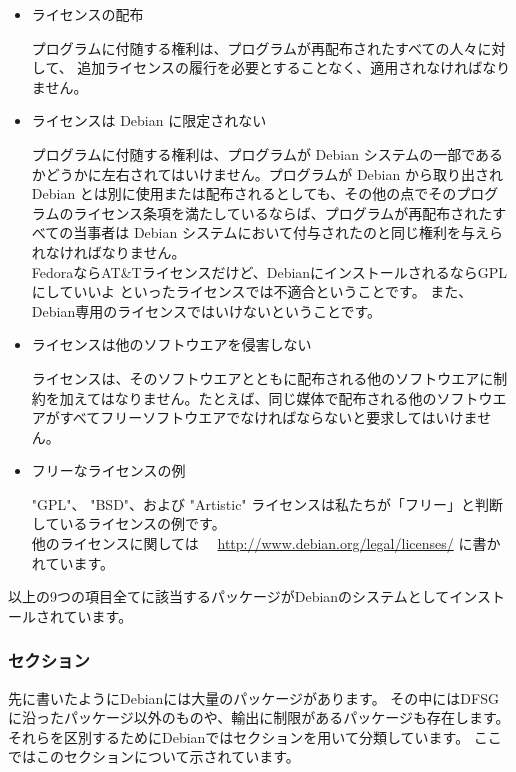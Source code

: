 \documentclass[mingoth,a4paper]{jsarticle}
\begin{document}
\begin{itemize}
 \item ライセンスの配布

プログラムに付随する権利は、プログラムが再配布されたすべての人々に対して、
追加ライセンスの履行を必要とすることなく、適用されなければなりません。


 \item ライセンスは Debian に限定されない

プログラムに付随する権利は、プログラムが Debian システムの一部であるかどうかに左右されてはいけません。プログラムが Debian から取り出され Debian とは別に使用または配布されるとしても、その他の点でそのプログラムのライセンス条項を満たしているならば、プログラムが再配布されたすべての当事者は Debian システムにおいて付与されたのと同じ権利を与えられなければなりません。
\\

FedoraならAT\&Tライセンスだけど、DebianにインストールされるならGPLにしていいよ  といったライセンスでは不適合ということです。
また、Debian専用のライセンスではいけないということです。
	  
 \item ライセンスは他のソフトウエアを侵害しない

ライセンスは、そのソフトウエアとともに配布される他のソフトウエアに制約を加えてはなりません。たとえば、同じ媒体で配布される他のソフトウエアがすべてフリーソフトウエアでなければならないと要求してはいけません。


 \item フリーなライセンスの例

"GPL"、 "BSD"、および "Artistic" ライセンスは私たちが「フリー」と判断しているライセンスの例です。
\\

他のライセンスに関しては　	
\url{http://www.debian.org/legal/licenses/}
に書かれています。

\end{itemize}
以上の9つの項目全てに該当するパッケージがDebianのシステムとしてインストールされています。
	
\subsubsection{セクション}
	先に書いたようにDebianには大量のパッケージがあります。
	その中にはDFSGに沿ったパッケージ以外のものや、輸出に制限があるパッケージも存在します。
	それらを区別するためにDebianではセクションを用いて分類しています。
	ここではこのセクションについて示されています。
\end{document}
